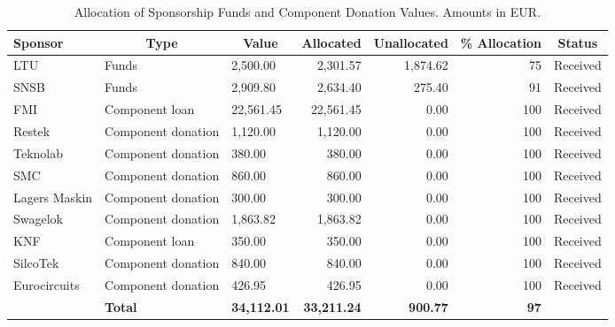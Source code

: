 \begin{table}[H]
\centering
\begin{tabular}{l|m{}|l|r|r|r|c}
\hline
\multicolumn{1}{|l|}{\textbf{Sponsor}} & \multicolumn{1}{|c|}{\textbf{Type}} & \multicolumn{1}{c|}{\textbf{Value}} & \multicolumn{1}{c|}{\textbf{Allocated}} & \multicolumn{1}{c|}{\textbf{Unallocated}} & \multicolumn{1}{c|}{\textbf{\% Allocation}} & \multicolumn{1}{c|}{\textbf{Status}} \\ \hline
\multicolumn{1}{|l|}{LTU} & Funds & 2,500.00 & 2,301.57 & 1,874.62 & 75 & \multicolumn{1}{c|}{Received} \\ \hline
\multicolumn{1}{|l|}{SNSB} & Funds & 2,909.80 & 2,634.40 & 275.40 & 91 & \multicolumn{1}{c|}{Received} \\ \hline
\multicolumn{1}{|l|}{FMI} & Component loan & 22,561.45 & 22,561.45 & 0.00 & 100 & \multicolumn{1}{c|}{Received} \\ \hline
\multicolumn{1}{|l|}{Restek} & Component donation & 1,120.00 & 1,120.00 & 0.00 & 100 & \multicolumn{1}{c|}{Received} \\ \hline
\multicolumn{1}{|l|}{Teknolab} & Component donation & 380.00 & 380.00 & 0.00 & 100 & \multicolumn{1}{c|}{Received} \\ \hline
\multicolumn{1}{|l|}{SMC} & Component donation & 860.00 & 860.00 & 0.00 & 100 & \multicolumn{1}{c|}{Received} \\ \hline
\multicolumn{1}{|l|}{Lagers Maskin} & Component donation & 300.00 & 300.00 & 0.00 & 100 & \multicolumn{1}{c|}{Received} \\ \hline
\multicolumn{1}{|l|}{Swagelok} & Component donation & 1,863.82 & 1,863.82 & 0.00 & 100 & \multicolumn{1}{c|}{Received} \\ \hline
\multicolumn{1}{|l|}{KNF} & Component loan & 350.00 & 350.00 & 0.00 & 100 & \multicolumn{1}{c|}{Received} \\ \hline
\multicolumn{1}{|l|}{SilcoTek} & Component donation & 840.00 & 840.00 & 0.00 & 100 & \multicolumn{1}{c|}{Received} \\ \hline
\multicolumn{1}{|l|}{Eurocircuits} & Component donation & 426.95 & 426.95 & 0.00 & 100 & \multicolumn{1}{c|}{Received} \\ \hline
 & \multicolumn{1}{l|}{\textbf{Total}} & \textbf{34,112.01} & \textbf{33,211.24} & \textbf{900.77} & \textbf{97} & \multicolumn{1}{l}{} \\ \cline{2-6}
\end{tabular}
\caption{Allocation of Sponsorship Funds and Component Donation Values. Amounts in EUR.}
\label{table:sponsroship-allocation}
\end{table} 